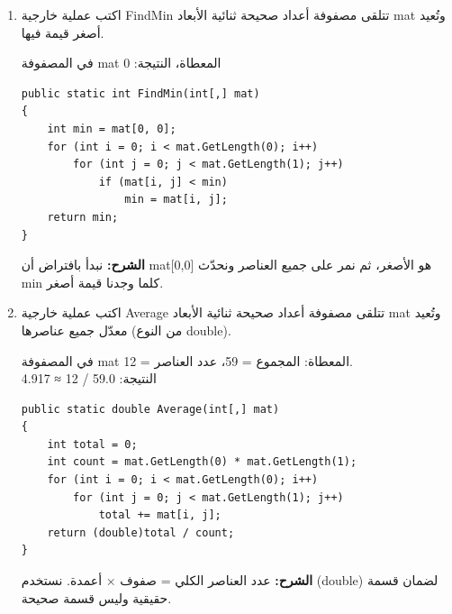 \documentclass[14pt]{extarticle}
\begin{document}
\begin{enumerate}[itemsep=2em]

\item
اكتب عملية خارجية \textenglish{FindMin} تتلقى مصفوفة أعداد صحيحة ثنائية الأبعاد \textenglish{mat} وتُعيد أصغر قيمة فيها.

\begin{boxExample}
في المصفوفة \textenglish{mat} المعطاة، النتيجة: \textenglish{0}
\end{boxExample}

\ifwithsols
\begin{boxSolution}
\begin{boxCode}
\begin{english}
\begin{verbatim}
public static int FindMin(int[,] mat)
{
    int min = mat[0, 0];
    for (int i = 0; i < mat.GetLength(0); i++)
        for (int j = 0; j < mat.GetLength(1); j++)
            if (mat[i, j] < min)
                min = mat[i, j];
    return min;
}
\end{verbatim}
\end{english}
\end{boxCode}
\textbf{الشرح:} نبدأ بافتراض أن \textenglish{mat[0,0]} هو الأصغر، ثم نمر على جميع العناصر ونحدّث \textenglish{min} كلما وجدنا قيمة أصغر.
\end{boxSolution}
\clearpage
\fi

\item
اكتب عملية خارجية \textenglish{Average} تتلقى مصفوفة أعداد صحيحة ثنائية الأبعاد \textenglish{mat} وتُعيد معدّل جميع عناصرها (من النوع \textenglish{double}).

\begin{boxExample}
في المصفوفة \textenglish{mat} المعطاة: المجموع = \textenglish{59}، عدد العناصر = \textenglish{12}. \\
النتيجة: \textenglish{59.0 / 12 ≈ 4.917}
\end{boxExample}

\ifwithsols
\begin{boxSolution}
\begin{boxCode}
\begin{english}
\begin{verbatim}
public static double Average(int[,] mat)
{
    int total = 0;
    int count = mat.GetLength(0) * mat.GetLength(1);
    for (int i = 0; i < mat.GetLength(0); i++)
        for (int j = 0; j < mat.GetLength(1); j++)
            total += mat[i, j];
    return (double)total / count;
}
\end{verbatim}
\end{english}
\end{boxCode}
\textbf{الشرح:} عدد العناصر الكلي = صفوف × أعمدة. نستخدم \textenglish{(double)} لضمان قسمة حقيقية وليس قسمة صحيحة.
\end{boxSolution}
\fi
\clearpage


\end{enumerate}
\end{document}
